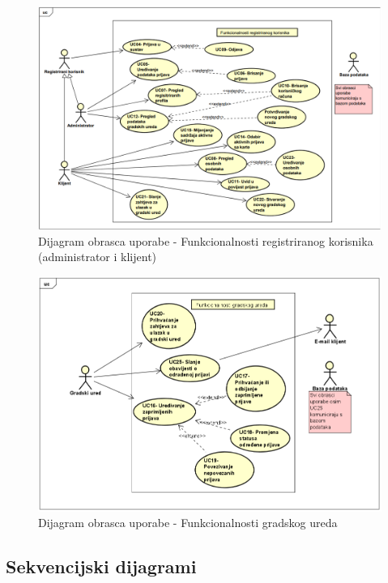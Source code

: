 		
		\begin{figure}[H]
			\includegraphics[scale=0.8]{slike/obrazac_registereduser.PNG} %
			\centering
			\caption{Dijagram obrasca uporabe - Funkcionalnosti registriranog korisnika (administrator i klijent)}
		\end{figure}		
				
				
				\begin{figure}[H]
			\includegraphics[scale=0.8]{slike/obrazac_gradski.PNG} %
			\centering
			\caption{Dijagram obrasca uporabe - Funkcionalnosti gradskog ureda}
		\end{figure}
			\subsection{Sekvencijski dijagrami}
				
